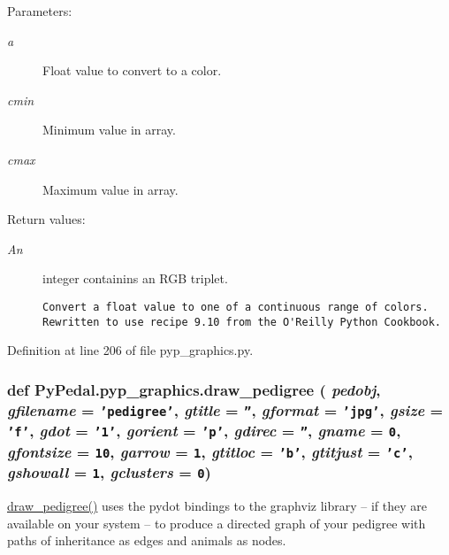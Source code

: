 \begin{Desc}
\item[Parameters:]
\begin{description}
\item[{\em a}]Float value to convert to a color. \item[{\em cmin}]Minimum value in array. \item[{\em cmax}]Maximum value in array. \end{description}
\end{Desc}
\begin{Desc}
\item[Return values:]
\begin{description}
\item[{\em An}]integer containins an RGB triplet.

\footnotesize\begin{verbatim}Convert a float value to one of a continuous range of colors.
Rewritten to use recipe 9.10 from the O'Reilly Python Cookbook.
\end{verbatim}
\normalsize
 \end{description}
\end{Desc}


Definition at line 206 of file pyp\_\-graphics.py.\hypertarget{namespacePyPedal_1_1pyp__graphics_60eaf4bd218e2b1f32385ce9e6b8e066}{
\subsubsection[draw\_\-pedigree]{\setlength{\rightskip}{0pt plus 5cm}def Py\-Pedal.pyp\_\-graphics.draw\_\-pedigree ( {\em pedobj},  {\em gfilename} = {\tt 'pedigree'},  {\em gtitle} = {\tt ''},  {\em gformat} = {\tt 'jpg'},  {\em gsize} = {\tt 'f'},  {\em gdot} = {\tt '1'},  {\em gorient} = {\tt 'p'},  {\em gdirec} = {\tt ''},  {\em gname} = {\tt 0},  {\em gfontsize} = {\tt 10},  {\em garrow} = {\tt 1},  {\em gtitloc} = {\tt 'b'},  {\em gtitjust} = {\tt 'c'},  {\em gshowall} = {\tt 1},  {\em gclusters} = {\tt 0})}}
\label{namespacePyPedal_1_1pyp__graphics_60eaf4bd218e2b1f32385ce9e6b8e066}


\hyperlink{namespacePyPedal_1_1pyp__graphics_60eaf4bd218e2b1f32385ce9e6b8e066}{draw\_\-pedigree()} uses the pydot bindings to the graphviz library -- if they are available on your system -- to produce a directed graph of your pedigree with paths of inheritance as edges and animals as nodes. 

